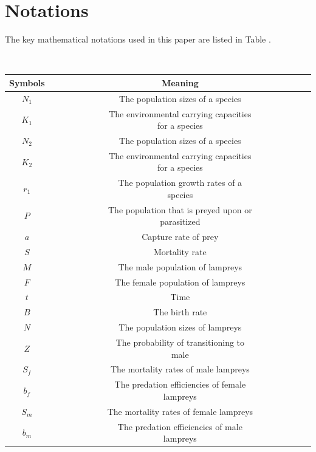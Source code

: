 \documentclass[CTeX = true]{mcmthesis}  %
\begin{document}
\section{Notations}
The key mathematical notations used in this paper are listed in Table \label{Symbol Description}.
\begin{longtable}[hhhh]
  \centering
  \label{Symbol Description}
  \caption{Symbol Description}\\
  \begin{tabular}{cccc}
   \toprule
  Symbols & ~~~~~~~~~ & Meaning & ~~~~~~~~~\\
   \midrule
   $N_{1}$ & ~~~~~~~~~ & The population sizes of  a species & ~~~~~~~~~\\
   $K_{1}$  & ~~~~~~~~~ & The environmental carrying capacities for  a species & ~~~~~~~~~ \\
   $N_{2}$ & ~~~~~~~~~ & The population sizes of  a species & ~~~~~~~~~ \\
   $K_{2}$  & ~~~~~~~~~ & The environmental carrying capacities for  a species & ~~~~~~~~~\\
   $r_{1}$  & ~~~~~~~~~ & The population growth rates of  a species & ~~~~~~~~~ \\
   $P$  & ~~~~~~~~~ & The population that is preyed upon or parasitized & ~~~~~~~~~ \\
   $a$  & ~~~~~~~~~ & Capture rate of prey & ~~~~~~~~~ \\
  $S$  & ~~~~~~~~~ & Mortality rate & ~~~~~~~~~ \\
  $M$  & ~~~~~~~~~ &  The male population of lampreys & ~~~~~~~~~ \\
  $F$  & ~~~~~~~~~ &  The female population of lampreys & ~~~~~~~~~ \\
  $t$  & ~~~~~~~~~ &  Time & ~~~~~~~~~ \\
  $B$  & ~~~~~~~~~ & The birth rate & ~~~~~~~~~\\
  $N$  & ~~~~~~~~~ & The population sizes of lampreys & ~~~~~~~~~ \\
  $Z$  & ~~~~~~~~~ & The probability of transitioning to male & ~~~~~~~~~\\
  $S_{f}$  & ~~~~~~~~~ & The mortality rates of male lampreys & ~~~~~~~~~ \\
  $b_{f}$  & ~~~~~~~~~ & The predation efficiencies of female lampreys & ~~~~~~~~~ \\
  $S_{m}$  & ~~~~~~~~~ & The mortality rates of female lampreys & ~~~~~~~~~\\
  $b_{m}$  & ~~~~~~~~~ & The predation efficiencies of male lampreys & ~~~~~~~~~ \\

\end{tabular}
\end{longtable}
\end{document}
